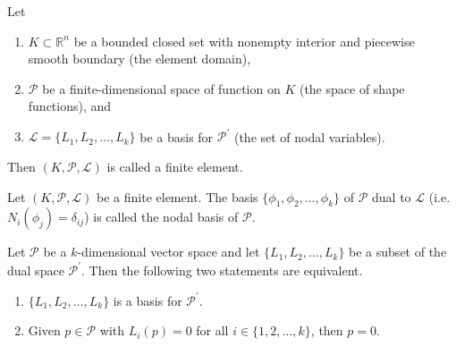 \begin{definition}
    Let
    \begin{enumerate}
        \item \(K \subset \mathbb{R}^n\) be a {\color{mathif}bounded closed set} with {\color{mathif}nonempty interior} and {\color{mathif}piecewise smooth boundary} (the {\color{mathrem}element domain}),
        \item \(\mathcal{P}\) be a {\color{mathif}finite-dimensional space of function} on \(K\) (the space of {\color{mathrem}shape functions}), and
        \item \(\mathcal{L} = \{L_1, L_2, \ldots, L_k\}\) be a {\color{mathif}basis} for \(\mathcal{P}^\prime\) (the set of {\color{mathrem}nodal variables}).
    \end{enumerate}
    Then \((K, \mathcal{P}, \mathcal{L})\) is called a {\color{maththen}finite element}.
\end{definition}

\begin{definition}
    Let \((K, \mathcal{P}, \mathcal{L})\) be a finite element. The basis \(\{\phi_1, \phi_2, \ldots, \phi_k\}\) of \(\mathcal{P}\) dual to \(\mathcal{L}\) (i.e. \(N_i(\phi_j) = \delta_{ij}\)) is called the nodal basis of \(\mathcal{P}\).
\end{definition}

\begin{lemma}
    Let \(\mathcal{P}\) be a \(k\)-dimensional vector space and let \(\{L_1, L_2, \ldots, L_k\}\) be a subset of the dual space \(\mathcal{P}^\prime\). Then the following two statements are equivalent.
    \begin{enumerate}
        \item \(\{L_1, L_2, \ldots, L_k\}\) is a basis for \(\mathcal{P}^\prime\).
        \item Given \(p \in \mathcal{P}\) with \(L_i(p) = 0\) for all \(i \in \{1, 2, \ldots, k\}\), then \(p = 0\).
    \end{enumerate}
\end{lemma}

